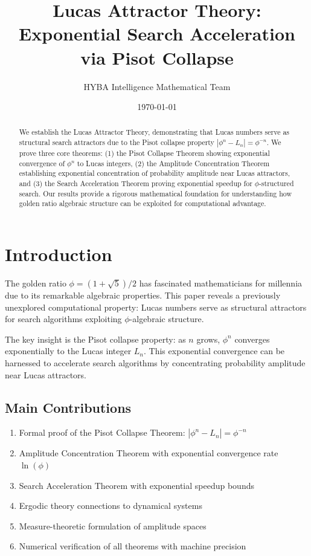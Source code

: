 \documentclass{article}
\title{Lucas Attractor Theory: Exponential Search Acceleration via Pisot Collapse}
\author{HYBA Intelligence Mathematical Team}
\date{\today}
\theoremstyle{remark}
\begin{document}
\maketitle

\begin{abstract}
We establish the Lucas Attractor Theory, demonstrating that Lucas numbers serve as structural search attractors due to the Pisot collapse property $|\phi^n - L_n| = \phi^{-n}$. We prove three core theorems: (1) the Pisot Collapse Theorem showing exponential convergence of $\phi^n$ to Lucas integers, (2) the Amplitude Concentration Theorem establishing exponential concentration of probability amplitude near Lucas attractors, and (3) the Search Acceleration Theorem proving exponential speedup for $\phi$-structured search. Our results provide a rigorous mathematical foundation for understanding how golden ratio algebraic structure can be exploited for computational advantage.
\end{abstract}

\section{Introduction}

The golden ratio $\phi = (1 + \sqrt{5})/2$ has fascinated mathematicians for millennia due to its remarkable algebraic properties. This paper reveals a previously unexplored computational property: Lucas numbers serve as structural attractors for search algorithms exploiting $\phi$-algebraic structure.

The key insight is the Pisot collapse property: as $n$ grows, $\phi^n$ converges exponentially to the Lucas integer $L_n$. This exponential convergence can be harnessed to accelerate search algorithms by concentrating probability amplitude near Lucas attractors.

\subsection{Main Contributions}

\begin{enumerate}
\item Formal proof of the Pisot Collapse Theorem: $|\phi^n - L_n| = \phi^{-n}$
\item Amplitude Concentration Theorem with exponential convergence rate $\ln(\phi)$
\item Search Acceleration Theorem with exponential speedup bounds
\item Ergodic theory connections to dynamical systems
\item Measure-theoretic formulation of amplitude spaces
\item Numerical verification of all theorems with machine precision
\end{enumerate}
\end{document}
